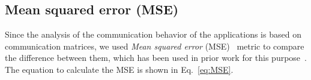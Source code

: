 

\subsection{Mean squared error (MSE)}\label{sec:MSE}

Since the analysis of the communication behavior of the applications is based on communication matrices, we used \emph{Mean squared error} (MSE)~\cite{MSE} metric to compare the difference between them, which has been used in prior work for this purpose~\cite{Diener:2016:2}. The equation to calculate the MSE is shown in Eq.~\ref{eq:MSE}.

